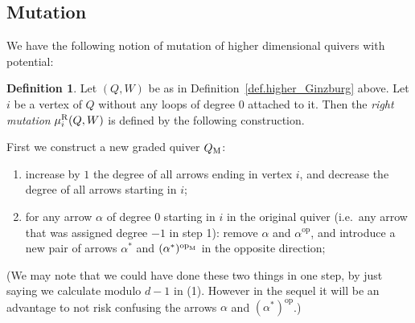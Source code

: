 \documentclass[a4paper,11pt]{amsart}
\theoremstyle{definition}
\newtheorem{definition}[theorem]{Definition}
\DeclareMathOperator{\op}{op}
\newcommand{\m}{_{\rm M}}
\numberwithin{theorem}{section}
\begin{document}
\subsection*{Mutation}

We have the following notion of mutation of higher dimensional quivers with potential:

\begin{definition}
Let $(Q, W)$ be as in Definition~\ref{def.higher_Ginzburg} above. Let $i$ be a vertex of $Q$ without any loops of degree $0$ attached to it. Then the \emph{right mutation} $\mu^{\rm R}_i(Q, W)$ is defined by the following construction.

First we construct a new graded quiver $Q\m$:
\begin{enumerate}
\item increase by $1$ the degree of all arrows ending in vertex $i$, and decrease the degree of all arrows starting in $i$;
\item for any arrow $\alpha$ of degree $0$ starting in $i$ in the original quiver (i.e.\ any arrow that was assigned degree $-1$ in step 1): remove $\alpha$ and $\alpha^{\op}$, and introduce a new pair of arrows $\alpha^*$ and $(\alpha^*)^{\op\m}$ in the opposite direction;
\end{enumerate}
(We may note that we could have done these two things in one step, by just saying we calculate modulo $d-1$ in (1). However in the sequel it will be an advantage to not risk confusing the arrows $\alpha$ and $(\alpha^*)^{\op}$.)


\end{definition}
\end{document}
